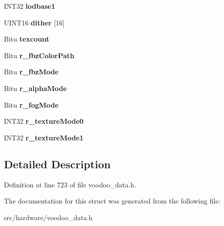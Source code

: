 \begin{DoxyCompactItemize}
\item 
\hypertarget{struct__poly__extra__data_a978cde56d266c77581a88c1d22d448a3}{I\-N\-T32 {\bfseries lodbase1}}\label{struct__poly__extra__data_a978cde56d266c77581a88c1d22d448a3}

\item 
\hypertarget{struct__poly__extra__data_ac4ebc768c0c15ad0f96f0d9a67406a62}{U\-I\-N\-T16 {\bfseries dither} \mbox{[}16\mbox{]}}\label{struct__poly__extra__data_ac4ebc768c0c15ad0f96f0d9a67406a62}

\item 
\hypertarget{struct__poly__extra__data_aafe60fcb1a440e0629f3513d14d121c0}{Bitu {\bfseries texcount}}\label{struct__poly__extra__data_aafe60fcb1a440e0629f3513d14d121c0}

\item 
\hypertarget{struct__poly__extra__data_a9da4778248791a7fae6cd2ac74d31eff}{Bitu {\bfseries r\-\_\-fbz\-Color\-Path}}\label{struct__poly__extra__data_a9da4778248791a7fae6cd2ac74d31eff}

\item 
\hypertarget{struct__poly__extra__data_a58c1591281c85eb2cfb422bd0c79b870}{Bitu {\bfseries r\-\_\-fbz\-Mode}}\label{struct__poly__extra__data_a58c1591281c85eb2cfb422bd0c79b870}

\item 
\hypertarget{struct__poly__extra__data_a008fd452346c60ee6384d524faec8e85}{Bitu {\bfseries r\-\_\-alpha\-Mode}}\label{struct__poly__extra__data_a008fd452346c60ee6384d524faec8e85}

\item 
\hypertarget{struct__poly__extra__data_a93f1bd6c1be17582a30416844df4762f}{Bitu {\bfseries r\-\_\-fog\-Mode}}\label{struct__poly__extra__data_a93f1bd6c1be17582a30416844df4762f}

\item 
\hypertarget{struct__poly__extra__data_a3fdff38fa77a154a59e4f072de79f3cd}{I\-N\-T32 {\bfseries r\-\_\-texture\-Mode0}}\label{struct__poly__extra__data_a3fdff38fa77a154a59e4f072de79f3cd}

\item 
\hypertarget{struct__poly__extra__data_a19811380eda6c18cbe1ae53b5cbeab84}{I\-N\-T32 {\bfseries r\-\_\-texture\-Mode1}}\label{struct__poly__extra__data_a19811380eda6c18cbe1ae53b5cbeab84}

\end{DoxyCompactItemize}


\subsection{Detailed Description}


Definition at line 723 of file voodoo\-\_\-data.\-h.



The documentation for this struct was generated from the following file\-:\begin{DoxyCompactItemize}
\item 
src/hardware/voodoo\-\_\-data.\-h\end{DoxyCompactItemize}
